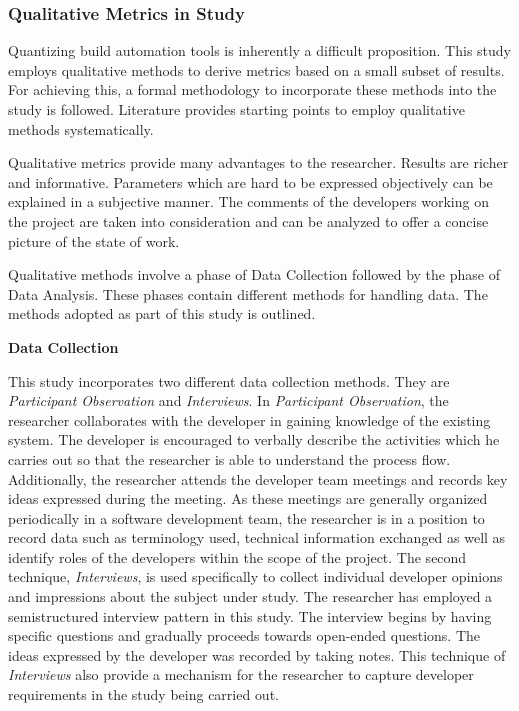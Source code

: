 \documentclass[12pt, a4paper, titlepage]{scrartcl}
\begin{document}
\subsubsection{Qualitative Metrics in Study}
Quantizing build automation tools is inherently a difficult proposition. This study employs qualitative methods to derive metrics based on a small subset of results. For achieving this, a formal methodology to incorporate these methods into the study is followed. Literature provides starting points to employ qualitative methods systematically\cite{seaman2009using}.  
\par Qualitative metrics provide many advantages to the researcher. Results are richer and informative. Parameters which are hard to be expressed objectively can be explained in a subjective manner. The comments of the developers working on the project are taken into consideration and can be analyzed to offer a concise picture of the state of work.  
\par Qualitative methods involve a phase of Data Collection followed by the phase of Data Analysis. These phases contain different methods for handling data. The methods adopted as part of this study is outlined.
\par \textbf{Data Collection}
\par This study incorporates two different data collection methods. They are \textit{Participant Observation}\cite{taylor1984introduction} and \textit{Interviews}. In \textit{Participant Observation}, the researcher collaborates with the developer in gaining knowledge of the existing system. The developer is encouraged to verbally describe the activities which he carries out so that the researcher is able to understand the process flow. Additionally, the researcher attends the developer team meetings and records key ideas expressed during the meeting. As these meetings are generally organized periodically in a software development team, the researcher is in a position to record data such as terminology used, technical information exchanged as well as identify roles of the developers within the scope of the project. The second technique, \textit{Interviews}\cite{seaman2009using}, is used specifically to collect individual developer opinions and impressions about the subject under study. The researcher has employed a semistructured interview pattern in this study. The interview begins by having specific questions and gradually proceeds towards open-ended questions. The ideas expressed by the developer was recorded by taking notes. This technique of \textit{Interviews} also provide a mechanism for the researcher to capture developer requirements in the study being carried out.
\end{document}
